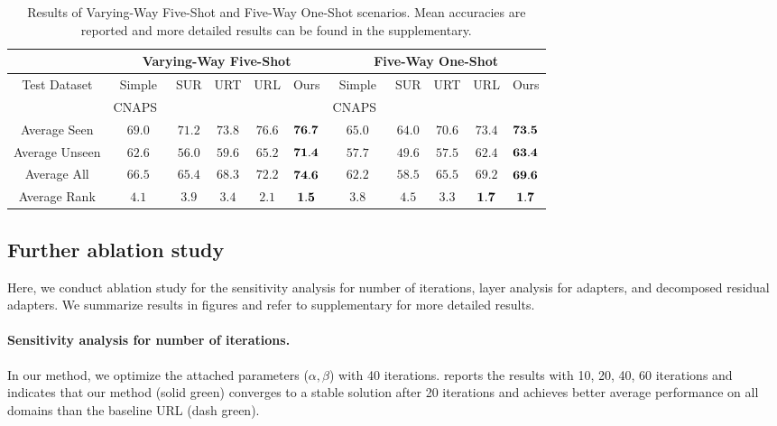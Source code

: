 \begin{table}[h]
	\centering
	    \resizebox{1.0\textwidth}{!}
    {
		\begin{tabular}{cccccc|ccccc}
			& \multicolumn{5}{c}{Varying-Way Five-Shot} & \multicolumn{5}{c}{Five-Way One-Shot} \\
		    \toprule
		    \multirow{2}{*}{Test Dataset} & Simple & SUR & URT & URL & \multirow{2}{*}{Ours}& Simple & SUR & URT & URL & \multirow{2}{*}{Ours}\\
		    &  CNAPS~\cite{bateni2020improved}  & \cite{dvornik2020selecting} & \cite{liu2020universal} & \cite{li2021universal} & & CNAPS~\cite{bateni2020improved} & \cite{dvornik2020selecting}& \cite{liu2020universal} & \cite{li2021universal} & \\
		    \midrule
		    Average Seen & $69.0$ & $71.2$ & $73.8$ & $76.6$ & ${\bf 76.7}$ & $65.0$ & $64.0$ & $70.6$ & $73.4$ & ${\bf 73.5}$ \\
		    Average Unseen & $62.6$ & $56.0$ & $59.6$ & $65.2$ & ${\bf 71.4}$ & $57.7$ & $49.6$ & $57.5$ & $62.4$ & ${\bf 63.4}$ \\
		    Average All & $66.5$ & $65.4$ & $68.3$ & $72.2$ & ${\bf 74.6}$ & $62.2$ & $58.5$ & $65.5$ & $69.2$ & ${\bf 69.6}$ \\
		    \midrule
		    Average Rank & $4.1$ & $3.9$ & $3.4$ & $2.1$ & ${\bf 1.5}$ & $3.8$ & $4.5$ & $3.3$ & ${\bf 1.7}$ & ${\bf 1.7}$ \\
			\bottomrule
		\end{tabular}%
			}
		\vspace{-0.25cm}
		\caption{Results of  Varying-Way Five-Shot and Five-Way One-Shot scenarios. Mean accuracies are reported and more detailed results can be found in the supplementary.}
		\label{tab:fixedshot}
\end{table}%
\vspace{-0.2cm}

\subsection{Further ablation study}
Here, we conduct ablation study for the sensitivity analysis for number of iterations, layer analysis for adapters, and decomposed residual adapters. We summarize results in figures and refer to supplementary for more detailed results.

\paragraph{Sensitivity analysis for number of iterations.}
In our method, we optimize the attached parameters ($\alpha,\beta$) with 40 iterations.  reports
the results with 10, 20, 40, 60 iterations and indicates that our method (solid green) converges to a stable solution after 20 iterations and achieves better average performance on all domains than the baseline URL (dash green). 



